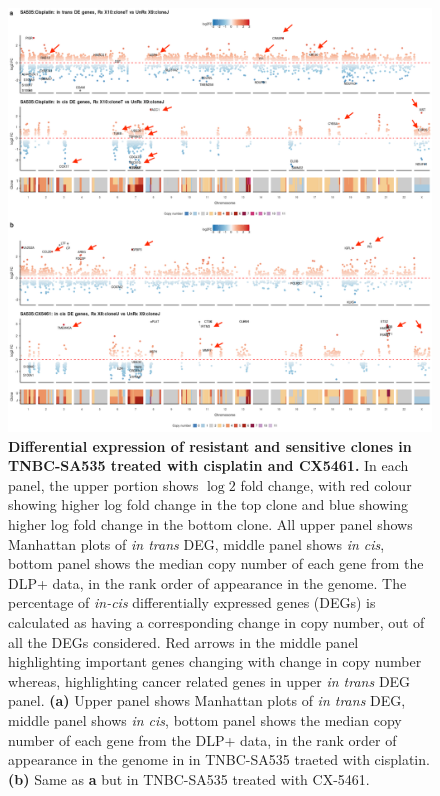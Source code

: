 \begin{figure}
\centering
  \includegraphics[width=\textwidth]{Figures/chap5/trackplotsSA535.png}
\caption[DE of resistant and sensitive \texttt{clonealign} defined clones]
	{\small
	\textbf{Differential expression of resistant and sensitive clones in TNBC-SA535 treated with cisplatin and CX5461.}
 In each panel, the upper portion shows $\log 2$ fold change, with red colour showing higher log fold change in the top clone and blue showing higher log fold change in the bottom clone. All upper panel shows Manhattan plots of \textit{in trans} DEG, middle panel shows \textit{in cis}, bottom panel shows the median copy number of each gene from the DLP+ data, in the rank order of appearance in the genome.
 The percentage of \textit{in-cis} differentially expressed genes (DEGs) is calculated as having a corresponding change in copy number, out of all the DEGs considered. Red arrows in the middle panel highlighting important genes changing with change in copy number whereas, highlighting cancer related genes in upper \textit{in trans} DEG panel.  
 \textbf{(a)} Upper panel shows Manhattan plots of \textit{in trans} DEG, middle panel shows \textit{in cis}, bottom panel shows the median copy number of each gene from the DLP+ data, in the rank order of appearance in the genome in in TNBC-SA535 traeted with cisplatin.
 \textbf{(b)} Same as  \textbf{a} but in TNBC-SA535 treated with CX-5461.
}
	\label{fig:trackplotsSA535}
 \end{figure}

